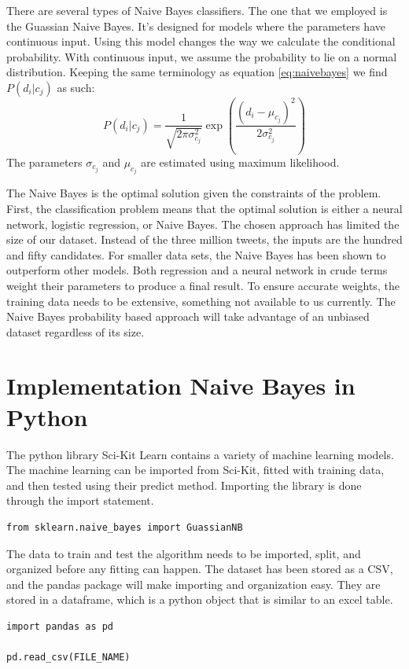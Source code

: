 \documentclass[11pt, twoside, reqno]{article}
\begin{document}
There are several types of Naive Bayes classifiers. The one that we employed is the Guassian Naive Bayes. It's designed for models where the parameters have continuous input. Using this model changes the way we calculate the conditional probability. With continuous input, we assume the probability to lie on a normal distribution. Keeping the same terminology as equation \ref{eq:naivebayes} we find $P(d_i | c_j)$ as such:
\begin{equation}
\label{eq:gaussprob}
P(d_i | c_j) = \dfrac{1}{\sqrt{2\pi\sigma^{2}_{c_j}}}\exp\left(\dfrac{(d_i - \mu_{c_j})^2}{2\sigma^{2}_{c_j}}\right)
\end{equation}
The parameters $\sigma_{c_j}$ and $\mu_{c_j}$ are estimated using maximum likelihood. 

The Naive Bayes is the optimal solution given the constraints of the problem. First, the classification problem means that the optimal solution is either a neural network, logistic regression, or Naive Bayes. The chosen approach has limited the size of our dataset. Instead of the three million tweets, the inputs are the hundred and fifty candidates. For smaller data sets, the Naive Bayes has been shown to outperform other models. Both regression and a neural network in crude terms weight their parameters to produce a final result. To ensure accurate weights, the training data needs to be extensive, something not available to us currently. The Naive Bayes probability based approach will take advantage of an unbiased dataset regardless of its size. 

\section{Implementation Naive Bayes in Python}
\hspace{0.2in}The python library Sci-Kit Learn contains a variety of machine learning models. The machine learning can be imported from Sci-Kit, fitted with training data, and then tested using their predict method. Importing the library is done through the import statement.
\begin{verbatim}
from sklearn.naive_bayes import GuassianNB
\end{verbatim}

The data to train and test the algorithm needs to be imported, split, and organized before any fitting can happen. The dataset has been stored as a CSV, and the pandas package will make importing and organization easy. They are stored in a dataframe, which is a python object that is similar to an excel table. 
\begin{verbatim}
import pandas as pd

pd.read_csv(FILE_NAME)
\end{verbatim}
\end{document}
